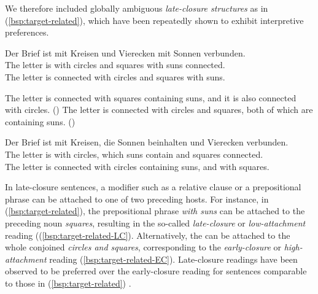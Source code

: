 \documentclass[fleqn,reqno,10pt,draft]{article}
\newcommand{\lc}{\acro{lc}}
\newcommand{\ec}{\acro{ec}}
\begin{document}
We therefore included globally ambiguous \emph{late-closure
  structures} as in (\ref{bsp:target-related}), which have been
repeatedly shown to exhibit interpretive preferences.
\begin{exe}
\ex \gll Der Brief ist mit Kreisen und Vierecken mit Sonnen
  verbunden. \label{bsp:target-related}\\
The letter is with circles and squares with suns connected.\\
The letter is connected with circles and squares with suns.
\begin{xlist}
  \ex \label{bsp:target-related-LC} The letter is connected with squares containing suns, and it is
    also connected with circles. \hfill{(\lc)}
  \ex \label{bsp:target-related-EC} The letter is connected with circles and squares, both of which
    are containing suns.  \hfill{(\ec)} 
\end{xlist}

\ex \gll Der Brief ist mit Kreisen, die Sonnen beinhalten und Vierecken
  verbunden. \label{bsp:target-related2}\\
The letter is with circles, which suns contain and squares connected.\\
The letter is connected with circles containing suns, and with squares.

\end{exe}
In late-closure sentences, a modifier such as a relative clause or a
prepositional phrase can be attached to one of two preceding
hosts. For instance, in (\ref{bsp:target-related}), the prepositional
phrase \emph{with suns} can be attached to the preceding noun
\emph{squares}, resulting in the so-called \emph{late-closure} or
\emph{low-attachment} reading
((\ref{bsp:target-related-LC}). Alternatively, the  can be
attached to the whole conjoined  \emph{circles and squares},
corresponding to the \emph{early-closure} or \emph{high-attachment}
reading (\ref{bsp:target-related-EC}).  Late-closure readings have
been observed to be preferred over the early-closure reading for
sentences comparable to those in (\ref{bsp:target-related})
\citep[e.g.][]{Frazier87,Frazier82}.
\end{document}
